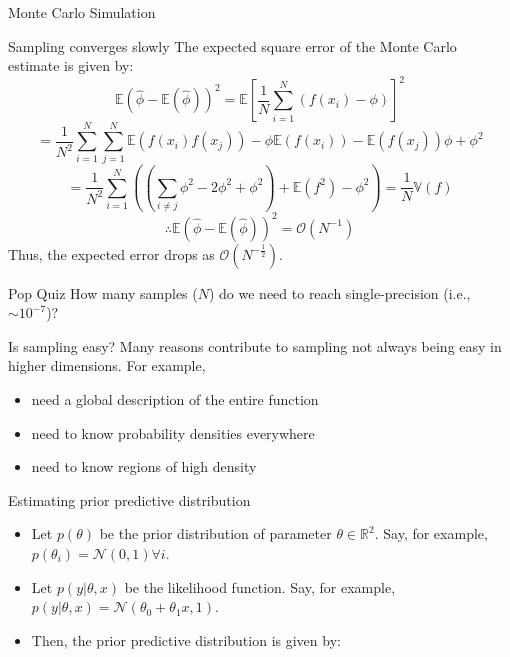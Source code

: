 \documentclass{beamer}
\begin{document}
\begin{section}{Monte Carlo Simulation}
    \begin{frame}{Sampling converges slowly}
        The expected square error of the Monte Carlo estimate is given by:
        $$
        \mathbb{E} \left( \hat{\phi} - \mathbb{E} (\hat{\phi}) \right)^2 = \mathbb{E} \left[ \frac{1}{N} \sum_{i=1}^{N} (f(x_i) - \phi) \right]^2 
        $$
        $$
        = \frac{1}{N^2} \sum_{i=1}^{N} \sum_{j=1}^{N} \mathbb{E} (f(x_i) f(x_j)) - \phi \mathbb{E} (f(x_i)) - \mathbb{E} (f(x_j)) \phi + \phi^2
        $$
        $$
        = \frac{1}{N^2} \sum_{i=1}^{N} \left( \left( \sum_{i \neq j}^{} \phi^2 - 2 \phi^2 + \phi^2 \right) + \mathbb{E} (f^2) - \phi^2 \right) = \frac{1}{N} \mathbb{V} (f)
        $$
        $$
        \therefore \mathbb{E} \left( \hat{\phi} - \mathbb{E} (\hat{\phi}) \right)^2 = \mathcal{O} (N^{-1})
        $$
        Thus, the expected error drops as $\mathcal{O} (N^{-\frac{1}{2}})$.
    \end{frame}

    \begin{frame}{Pop Quiz}
        How many samples ($N$) do we need to reach single-precision (i.e., $\sim 10^{-7}$)?
    \end{frame}

    \begin{frame}{Is sampling easy?}
        Many reasons contribute to sampling not always being easy in higher dimensions. For example,
        \begin{itemize}
            \item need a global description of the entire function
            \item need to know probability densities everywhere
            \item need to know regions of high density
        \end{itemize}
    \end{frame}

    \begin{frame}{Estimating prior predictive distribution}
        \begin{itemize}
            \item Let $p(\theta)$ be the prior distribution of parameter $\theta \in \mathbb{R}^2$. Say, for example, $p(\theta_i) = \mathcal{N}(0, 1) \forall i$.
            \item Let $p(y |\theta, x)$ be the likelihood function. Say, for example, $p(y|\theta, x) = \mathcal{N}(\theta_0 + \theta_1 x, 1)$.
            \item Then, the prior predictive distribution is given by:
        \end{itemize}


\end{frame}
\end{section}
\end{document}
